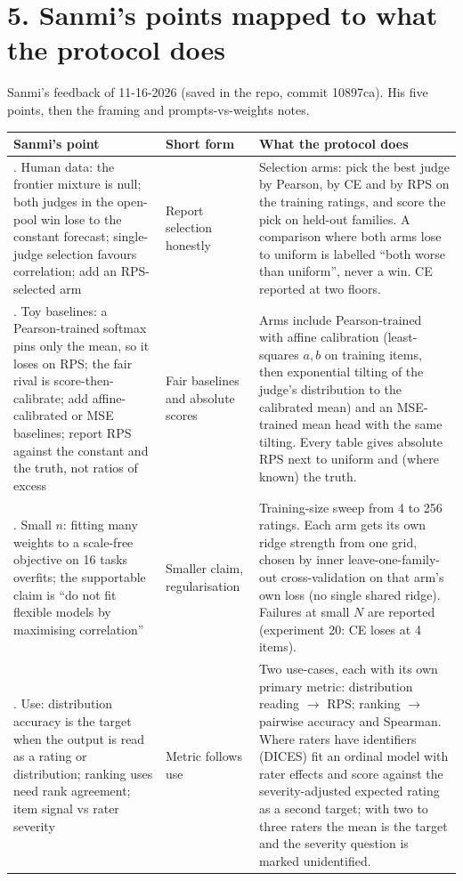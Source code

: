 \documentclass[10.5pt]{article}
\newcommand{\ra}{\raggedright\arraybackslash}
\begin{document}
\section*{5. Sanmi's points mapped to what the protocol does}
Sanmi's feedback of 11-16-2026 (saved in the repo, commit 10897ca). His five points, then the framing and prompts-vs-weights notes.
{\small\begin{longtable}{@{}>{\ra}p{3.3cm}>{\ra}p{5.0cm}>{\ra}p{7.2cm}@{}}
\toprule
Sanmi's point & Short form & What the protocol does\\
\midrule
1. Human data: the frontier mixture is null; both judges in the open-pool win lose to the constant forecast; single-judge selection favours correlation; add an RPS-selected arm & Report selection honestly & Selection arms: pick the best judge by Pearson, by CE and by RPS on the training ratings, and score the pick on held-out families. A comparison where both arms lose to uniform is labelled ``both worse than uniform'', never a win. CE reported at two floors.\\
2. Toy baselines: a Pearson-trained softmax pins only the mean, so it loses on RPS; the fair rival is score-then-calibrate; add affine-calibrated or MSE baselines; report RPS against the constant and the truth, not ratios of excess & Fair baselines and absolute scores & Arms include Pearson-trained with affine calibration (least-squares $a,b$ on training items, then exponential tilting of the judge's distribution to the calibrated mean) and an MSE-trained mean head with the same tilting. Every table gives absolute RPS next to uniform and (where known) the truth.\\
3. Small $n$: fitting many weights to a scale-free objective on 16 tasks overfits; the supportable claim is ``do not fit flexible models by maximising correlation'' & Smaller claim, regularisation & Training-size sweep from 4 to 256 ratings. Each arm gets its own ridge strength from one grid, chosen by inner leave-one-family-out cross-validation on that arm's own loss (no single shared ridge). Failures at small $N$ are reported (experiment 20: CE loses at 4 items).\\
4. Use: distribution accuracy is the target when the output is read as a rating or distribution; ranking uses need rank agreement; item signal vs rater severity & Metric follows use & Two use-cases, each with its own primary metric: distribution reading $\to$ RPS; ranking $\to$ pairwise accuracy and Spearman. Where raters have identifiers (DICES) fit an ordinal model with rater effects and score against the severity-adjusted expected rating as a second target; with two to three raters the mean is the target and the severity question is marked unidentified.\\

\end{longtable}}
\end{document}

